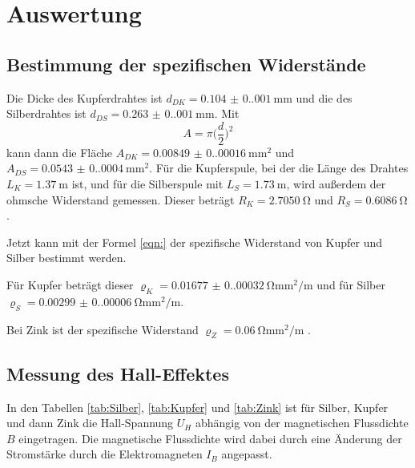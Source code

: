 \section{Auswertung}
\label{sec:Auswertung}

\subsection{Bestimmung der spezifischen Widerstände}
Die Dicke des Kupferdrahtes ist $d_{DK}=\qty{0.104(0.001)}{\milli\meter}$ und die des Silberdrahtes ist $d_{DS}=\qty{0.263(0.001)}{\milli\meter}$.
Mit 
\begin{equation}
  A=\pi \bigl(\frac{d}{2} \bigr)^2
\label{eqn:Querschnitt}
\end{equation}
\noindent 
kann dann die Fläche $A_{DK}=\qty{0.00849(0.00016)}{\milli\meter\squared}$ und $A_{DS}=\qty{0.0543(0.0004)}{\milli\meter\squared}$.
\noindent Für die Kupferspule, bei der die Länge des Drahtes $L_K=\qty{1.37}{\meter}$ ist, und für die Silberspule mit $L_S=\qty{1.73}{\meter}$, wird außerdem der ohmsche Widerstand gemessen.
Dieser beträgt $R_K=\qty{2.7050}{\ohm}$ und $R_S=\qty{0.6086}{\ohm}$.

\noindent Jetzt kann mit der Formel \ref{eqn:} der spezifische Widerstand von Kupfer und Silber bestimmt werden.


\noindent Für Kupfer beträgt dieser $\varrho_K=\qty{0.01677(0.00032)}{\ohm\milli\meter\squared\per\m}$ und für Silber $\varrho_S=\qty{0.00299(0.00006)}{\ohm\milli\meter\squared\per\m}$.

\noindent Bei Zink ist der spezifische Widerstand $\varrho_Z = \qty{0.06}{\ohm\milli\meter\squared\per\m}$ \cite{Zink}.


\subsection{Messung des Hall-Effektes}

In den Tabellen \ref{tab:Silber}, \ref{tab:Kupfer} und \ref{tab:Zink} ist für Silber, Kupfer und dann Zink die Hall-Spannung $U_H$ abhängig von der magnetischen Flussdichte $B$ eingetragen.
Die magnetische Flussdichte wird dabei durch eine Änderung der Stromstärke durch die Elektromagneten $I_B$ angepasst.
 

